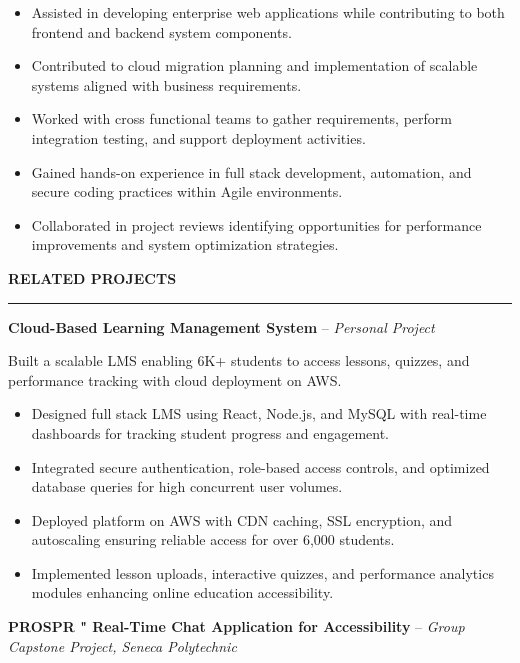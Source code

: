 \documentclass[10pt,letterpaper]{article}
\begin{document}
\begin{itemize}
\item Assisted in developing enterprise web applications while contributing to both frontend and backend system components.
\item Contributed to cloud migration planning and implementation of scalable systems aligned with business requirements.
\item Worked with cross functional teams to gather requirements, perform integration testing, and support deployment activities.
\item Gained hands-on experience in full stack development, automation, and secure coding practices within Agile environments.
\item Collaborated in project reviews identifying opportunities for performance improvements and system optimization strategies.
\end{itemize}

\vspace{6pt}

\textbf{RELATED PROJECTS}\\[-8pt]
\noindent\rule{\textwidth}{1pt}

\vspace{-2pt}

\textbf{Cloud-Based Learning Management System} -- \emph{Personal Project}

\vspace{-1pt}

Built a scalable LMS enabling 6K+ students to access lessons, quizzes, and performance tracking with cloud deployment on AWS.
\vspace{-1pt}
\begin{itemize}
\item Designed full stack LMS using React, Node.js, and MySQL with real-time dashboards for tracking student progress and engagement.
\item Integrated secure authentication, role-based access controls, and optimized database queries for high concurrent user volumes.
\item Deployed platform on AWS with CDN caching, SSL encryption, and autoscaling ensuring reliable access for over 6,000 students.
\item Implemented lesson uploads, interactive quizzes, and performance analytics modules enhancing online education accessibility.
\end{itemize}

\textbf{PROSPR " Real-Time Chat Application for Accessibility} -- \emph{Group Capstone Project, Seneca Polytechnic}
\end{document}
